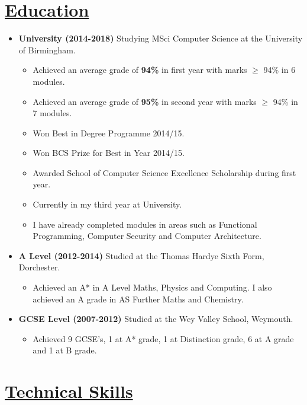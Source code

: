 \documentclass[11pt]{article}
\begin{document}
	\vspace{-30pt}
	\hspace{-100pt}\section*{\underline{Education}}
		\begin {itemize}
			\item \textbf{University (2014-2018)} Studying MSci Computer Science at the University of Birmingham.
				\begin{itemize}
					\item Achieved an average grade of\textbf{ 94\%} in first year with marks $\geq$ 94\% in 6 modules.
					\item Achieved an average grade of \textbf{95\%} in second year with marks $\geq$ 94\% in 7 modules.
					\item Won Best in Degree Programme 2014/15.
					\item Won BCS Prize for Best in Year 2014/15.
					\item Awarded School of Computer Science Excellence Scholarship during first year.
					\item Currently in my third year at University.
					\item I have already completed modules in areas such as Functional Programming, Computer Security and Computer Architecture.
				\end{itemize}
			\item \textbf{A Level (2012-2014)} Studied at the Thomas Hardye Sixth Form, Dorchester.
				\begin{itemize}
					\item Achieved an A* in A Level Maths, Physics and Computing. I also achieved an A grade in AS Further Maths and Chemistry.
				\end{itemize}
			
			\item \textbf{GCSE Level (2007-2012)}  Studied at the Wey Valley School, Weymouth.
				\begin{itemize}
					\item Achieved 9 GCSE's, 1 at A* grade, 1 at Distinction grade, 6 at A grade and 1 at B grade.
				\end{itemize} 
		\end{itemize}
	\vspace{-20pt}
	\hspace{-100pt}\section*{\underline{Technical Skills}}
\end{document}
